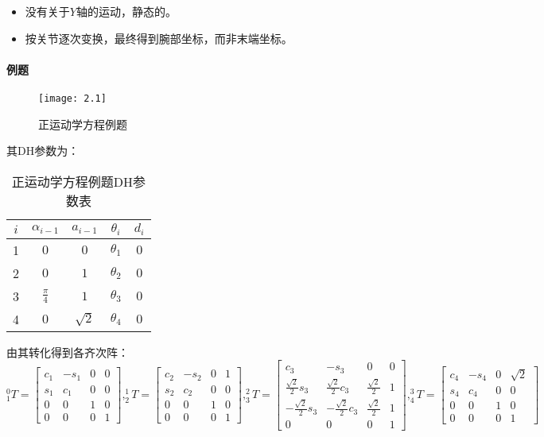 \documentclass[
12pt, %
a4paper, 
oneside, %
headinclude,footinclude, %
]{scrartcl}
\begin{document}
\begin{itemize}
\item 没有关于$ Y $轴的运动，静态的。
\item 按关节逐次变换，最终得到腕部坐标，而非末端坐标。
\end{itemize} 
\paragraph{例题}\label{sec:example2.1}
\begin{figure}[H]
\centering 
\texttt{[image: 2.1]} 
\caption[正运动学方程例题]{正运动学方程例题}
\end{figure}

其DH参数为：
\begin{table}[H]
\centering
\caption{正运动学方程例题DH参数表}
\begin{tabular}{c|cccc}
\hline
$ i $ & $ \alpha_{i - 1} $ & $ a_{i - 1} $ & $ \theta_i $ & $ d_i $ \\
\hline
1 & $ 0 $ & $ 0 $ & $ \theta_1 $ & $ 0 $ \\
2 & $ 0 $ & $ 1 $ & $ \theta_2 $ & $ 0 $ \\
3 & $ \frac{\pi}{4} $ & $ 1 $ & $ \theta_3 $ & $ 0 $ \\
4 & $ 0 $ & $ \sqrt{2} $ & $ \theta_4 $ & $ 0 $ \\
\hline
\end{tabular}
\end{table}

由其转化得到各齐次阵：
{\scriptsize
$$
^0_1T = \begin{bmatrix} c_1 & -s_1 & 0 & 0 \\ s_1 & c_1 & 0 & 0 \\ 0 & 0 & 1 & 0 \\ 0 & 0 & 0 & 1 \end{bmatrix},
^1_2T = \begin{bmatrix} c_2 & -s_2 & 0 & 1 \\ s_2 & c_2 & 0 & 0 \\ 0 & 0 & 1 & 0 \\ 0 & 0 & 0 & 1 \end{bmatrix},
^2_3T = \begin{bmatrix} c_3 & -s_3 & 0 & 0 \\ \frac{\sqrt{2}}{2}s_3 & \frac{\sqrt{2}}{2}c_3 & \frac{\sqrt{2}}{2} & 1 \\ -\frac{\sqrt{2}}{2}s_3 & -\frac{\sqrt{2}}{2}c_3 & \frac{\sqrt{2}}{2} & 1 \\ 0 & 0 & 0 & 1 \end{bmatrix},
^3_4T = \begin{bmatrix} c_4 & -s_4 & 0 & \sqrt{2} \\ s_4 & c_4 & 0 & 0 \\ 0 & 0 & 1 & 0 \\ 0 & 0 & 0 & 1 \end{bmatrix}
$$}
\end{document}
